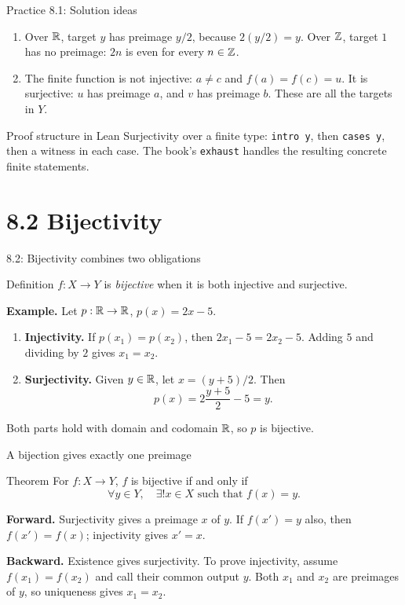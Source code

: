 \begin{frame}{Practice 8.1: Solution ideas}
\begin{enumerate}
\item Over $\mathbb{R}$, target $y$ has preimage $y/2$, because $2(y/2)=y$.
Over $\mathbb{Z}$, target $1$ has no preimage: $2n$ is even for every $n\in\mathbb{Z}$.
\item The finite function is not injective: $a\ne c$ and $f(a)=f(c)=u$.
It is surjective: $u$ has preimage $a$, and $v$ has preimage $b$.
These are all the targets in $Y$.
\end{enumerate}
\begin{block}{Proof structure in Lean}
Surjectivity over a finite type: \texttt{intro y}, then \texttt{cases y}, then a witness in each case.
The book's \texttt{exhaust} handles the resulting concrete finite statements.
\end{block}
\end{frame}

\section{8.2 Bijectivity}
\begin{frame}{8.2: Bijectivity combines two obligations}
\begin{block}{Definition}
$f:X\to Y$ is \emph{bijective} when it is both injective and surjective.
\end{block}
\textbf{Example.} Let $p:\mathbb{R}\to\mathbb{R}$, $p(x)=2x-5$.
\begin{enumerate}
\item \textbf{Injectivity.} If $p(x_1)=p(x_2)$, then
$2x_1-5=2x_2-5$. Adding $5$ and dividing by $2$ gives $x_1=x_2$.
\item \textbf{Surjectivity.} Given $y\in\mathbb{R}$, let $x=(y+5)/2$. Then
\[
p(x)=2\frac{y+5}{2}-5=y.
\]
\end{enumerate}
Both parts hold with domain and codomain $\mathbb{R}$, so $p$ is bijective.
\end{frame}

\begin{frame}{A bijection gives exactly one preimage}
\begin{block}{Theorem}
For $f:X\to Y$, $f$ is bijective if and only if
\[
 \forall y\in Y,\quad \exists!x\in X\text{ such that }f(x)=y.
\]
\end{block}
\textbf{Forward.} Surjectivity gives a preimage $x$ of $y$. If $f(x')=y$ also,
then $f(x')=f(x)$; injectivity gives $x'=x$.
\medskip

\textbf{Backward.} Existence gives surjectivity. To prove injectivity, assume
$f(x_1)=f(x_2)$ and call their common output $y$. Both $x_1$ and $x_2$ are preimages
of $y$, so uniqueness gives $x_1=x_2$.
\end{frame}

